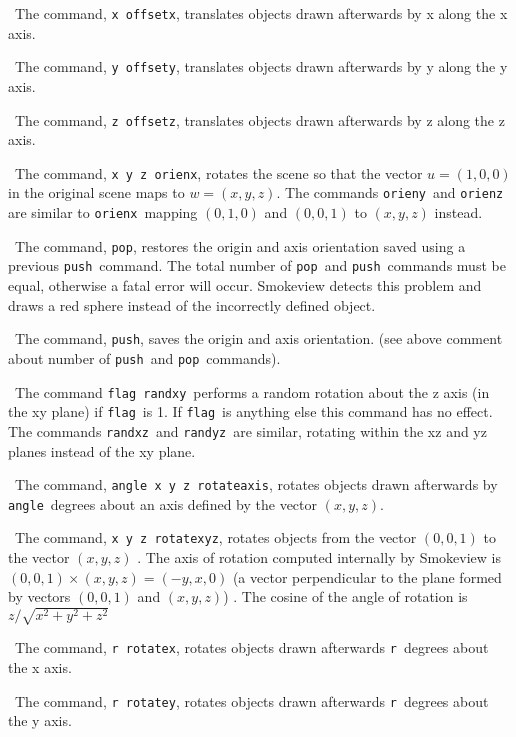 \documentclass[11pt,twoside]{book}
\newcommand{\hitem}[1]{\item[{\bf #1} \hfill]}
\begin{document}
\hitem{offsetx}\ The command, {\tt x offsetx}, translates objects drawn
afterwards by x along the x axis.

\hitem{offsety}\ The command, {\tt y offsety}, translates objects drawn
afterwards by y along the y axis.

\hitem{offsetz}\ The command, {\tt z offsetz}, translates objects drawn
afterwards by z along the z axis.

\hitem{orienx, orieny, orienz}\ The command, {\tt x y z orienx}, rotates
the scene so that the vector $u=(1,0,0)$ in the
original scene maps to $w=(x,y,z)$. The commands {\tt orieny}\ and {\tt orienz}
are similar to {\tt orienx}\ mapping $(0,1,0)$ and
$(0,0,1)$ to $(x,y,z)$ instead.

\hitem{pop}\ The command, {\tt pop}, restores the origin and axis orientation
saved using a previous {\tt push}\ command.  The total
number of {\tt pop}\ and {\tt push}\ commands must be equal, otherwise a
fatal error will occur.  Smokeview detects this problem and draws a red
sphere instead of the incorrectly defined object.

\hitem{push}\ The command, {\tt push}, saves the origin and axis orientation.
(see above comment about number of {\tt push}\ and
{\tt pop}\ commands).

\hitem{randxy, randxz, randyz}\ The command {\tt flag randxy}\ performs a
random rotation about the z axis (in the xy plane) if
{\tt flag}\ is 1. If {\tt flag}\ is anything else this command has no effect.
The commands {\tt randxz}\ and {\tt randyz}\ are similar,
rotating within the xz and yz planes instead of the xy plane.

\hitem{rotateaxis}\ The command, {\tt angle x y z rotateaxis}, rotates objects
drawn afterwards by {\tt angle}\ degrees about an
axis defined by the vector $(x,y,z)$.

\hitem{rotatexyz}\ The command, {\tt x y z rotatexyz}, rotates objects from the
vector $(0,0,1)$ to the vector $(x,y,z)$ .  The
axis of rotation computed internally by Smokeview is $(0,0,1)\times
(x,y,z)=(-y,x,0)$ (a vector perpendicular to the plane formed by vectors
$(0,0,1)$ and $(x,y,z)$) . The cosine of the angle of rotation is $z/\sqrt{x^2+y^2+z^2}$

\hitem{rotatex}\ The command, {\tt r rotatex}, rotates objects drawn afterwards
{\tt r}\ degrees about the x axis.

\hitem{rotatey}\ The command, {\tt r rotatey}, rotates objects drawn afterwards
{\tt r}\ degrees about the y axis.
\end{document}

